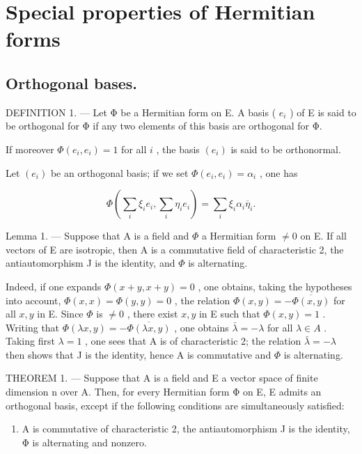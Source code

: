 \section{Special properties of Hermitian forms}

\subsection{Orthogonal bases.}

DEFINITION 1. --- Let Φ be a Hermitian form on E. A basis ( \(e_{i}\) ) of E is said to be orthogonal for Φ if any two elements of this basis are orthogonal for Φ.

If moreover \(\Phi(e_i, e_i) = 1\) for all \(i\) , the basis \((e_i)\) is said to be orthonormal.

Let \((e_i)\) be an orthogonal basis; if we set \(\Phi(e_i, e_i) = \alpha_i\) , one has

\[
\Phi (\sum_ {i} \xi_ {i} e _ {i}, \sum_ {i} \eta_ {i} e _ {i}) = \sum_ {i} \xi_ {i} \alpha_ {i} \overline {{\eta}} _ {i}.\tag{1}
\]

Lemma 1. --- Suppose that A is a field and \(\Phi\) a Hermitian form \(\neq 0\) on E. If all vectors of E are isotropic, then A is a commutative field of characteristic 2, the antiautomorphism J is the identity, and \(\Phi\) is alternating.

Indeed, if one expands \(\Phi(x+y, x+y)=0\) , one obtains, taking the hypotheses into account, \(\Phi(x,x)=\Phi(y,y)=0\) , the relation \(\Phi(x,y)=-\overline{\Phi(x,y)}\) for all \(x,y\) in E. Since \(\Phi\) is \(\neq 0\) , there exist \(x,y\) in E such that \(\Phi(x,y)=1\) . Writing that \(\Phi(\lambda x,y)=-\overline{\Phi(\lambda x,y)}\) , one obtains \(\bar{\lambda}=-\lambda\) for all \(\lambda\in A\) . Taking first \(\lambda=1\) , one sees that A is of characteristic 2; the relation \(\bar{\lambda}=-\lambda\) then shows that J is the identity, hence A is commutative and \(\Phi\) is alternating.

THEOREM 1. --- Suppose that A is a field and E a vector space of finite dimension n over A. Then, for every Hermitian form Φ on E, E admits an orthogonal basis, except if the following conditions are simultaneously satisfied:

\begin{enumerate}
\def\labelenumi{(\Alph{enumi})}
\setcounter{enumi}{2}
\tightlist
\item
  A is commutative of characteristic 2, the antiautomorphism J is the identity, Φ is alternating and nonzero.
\end{enumerate}

